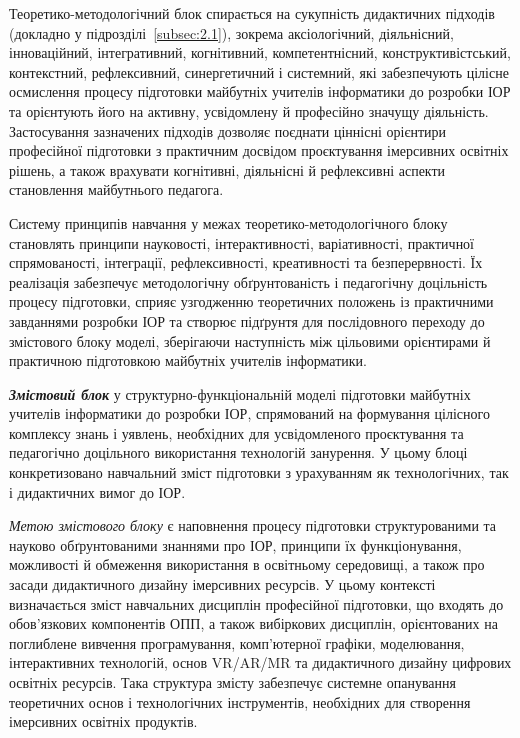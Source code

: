 Теоретико-методологічний блок спирається на сукупність дидактичних підходів (докладно у підрозділі~\ref{subsec:2.1}), зокрема аксіологічний, діяльнісний, інноваційний, інтегративний, когнітивний, компетентнісний, конструктивістський, контекстний, рефлексивний, синергетичний і системний, які забезпечують цілісне осмислення процесу підготовки майбутніх учителів інформатики до розробки ІОР та орієнтують його на активну, усвідомлену й професійно значущу діяльність. Застосування зазначених підходів дозволяє поєднати ціннісні орієнтири професійної підготовки з практичним досвідом проєктування імерсивних освітніх рішень, а також врахувати когнітивні, діяльнісні й рефлексивні аспекти становлення майбутнього педагога.

Систему принципів навчання у межах теоретико-методологічного блоку становлять принципи науковості, інтерактивності, варіативності, практичної спрямованості, інтеграції, рефлексивності, креативності та безперервності. Їх реалізація забезпечує методологічну обґрунтованість і педагогічну доцільність процесу підготовки, сприяє узгодженню теоретичних положень із практичними завданнями розробки ІОР та створює підґрунтя для послідовного переходу до змістового блоку моделі, зберігаючи наступність між цільовими орієнтирами й практичною підготовкою майбутніх учителів інформатики.

\emph{\textbf{Змістовий блок}} у структурно-функціональній моделі підготовки майбутніх учителів інформатики до розробки ІОР, спрямований на формування цілісного комплексу знань і уявлень, необхідних для усвідомленого проєктування та педагогічно доцільного використання технологій занурення. У цьому блоці конкретизовано навчальний зміст підготовки з урахуванням як технологічних, так і дидактичних вимог до ІОР.

\emph{Метою змістового блоку} є наповнення процесу підготовки структурованими та науково обґрунтованими знаннями про ІОР, принципи їх функціонування, можливості й обмеження використання в освітньому середовищі, а також про засади дидактичного дизайну імерсивних ресурсів. У цьому контексті визначається зміст навчальних дисциплін професійної підготовки, що входять до обов'язкових компонентів ОПП, а також вибіркових дисциплін, орієнтованих на поглиблене вивчення програмування, комп'ютерної графіки, моделювання, інтерактивних технологій, основ VR/AR/MR та дидактичного дизайну цифрових освітніх ресурсів. Така структура змісту забезпечує системне опанування теоретичних основ і технологічних інструментів, необхідних для створення імерсивних освітніх продуктів.

